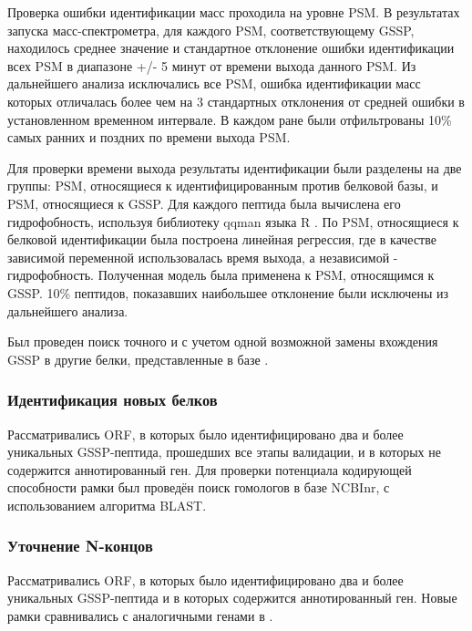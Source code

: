 Проверка ошибки идентификации масс проходила на уровне PSM. В результатах запуска масс-спектрометра, для каждого PSM, соответствующему GSSP, находилось среднее значение и стандартное отклонение ошибки идентификации всех PSM в диапазоне +/- 5 минут от времени выхода данного PSM. Из дальнейшего анализа исключались все PSM, ошибка идентификации масс которых отличалась более чем на 3 стандартных отклонения от средней ошибки в установленном временном интервале. В каждом ране были отфильтрованы 10\% самых ранних и поздних по времени выхода PSM.

Для проверки времени выхода результаты идентификации были разделены на две группы: PSM, относящиеся к идентифицированным против белковой базы, и PSM, относящиеся к GSSP. Для каждого пептида была вычислена его гидрофобность, используя библиотеку qqman языка R \cite{turner2014qqman}. По PSM, относящиеся к белковой идентификации была построена линейная регрессия, где в качестве зависимой переменной использовалась время выхода, а независимой - гидрофобность. Полученная модель была применена к PSM, относящимся к GSSP. 10\% пептидов, показавших наибольшее отклонение были исключены из дальнейшего анализа.

Был проведен поиск точного и с учетом одной возможной замены вхождения GSSP в другие белки, представленные в базе .  

\subsubsection{Идентификация новых белков}
Рассматривались ORF, в которых было идентифицировано два и более уникальных GSSP-пептида, прошедших все этапы валидации, и в которых не содержится аннотированный ген. Для проверки потенциала кодирующей способности рамки был проведён поиск гомологов в базе NCBInr, с использованием алгоритма BLAST. 

\subsubsection{Уточнение N-концов}
Рассматривались ORF, в которых было идентифицировано два и более уникальных GSSP-пептида и в которых содержится аннотированный ген. Новые рамки сравнивались с аналогичными генами в .


